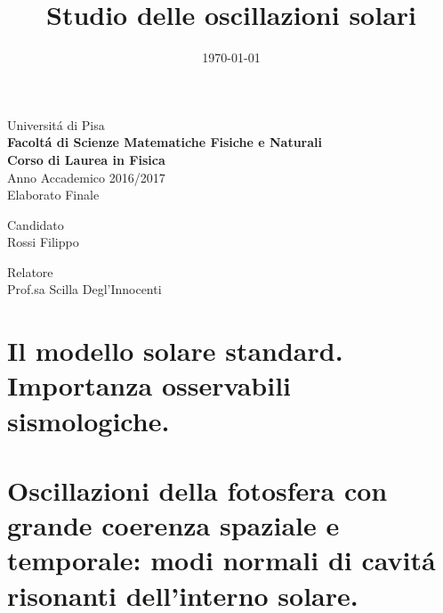 \documentclass[twoside,11pt,fleqn]{memoir}%
\author{ }
\title{Studio delle oscillazioni solari}
\date{\today}
\makeatletter
\newcommand{\titolo}{\@title}
\makeatother
\begin{document}
\begingroup

\thispagestyle{empty}
\begin{center}
\Huge Universit\'a di Pisa\\ \vspace{1cm}\textbf{\huge Facolt\'a di Scienze Matematiche Fisiche e Naturali}\\ \vspace{2cm} \textbf{\LARGE Corso di Laurea in Fisica}\\\Large Anno Accademico 2016/2017\\ \vspace{5cm} \LARGE Elaborato Finale\\ \vspace{1cm} \huge\titolo

\end{center}

\vspace{9cm}

\begin{minipage}[l]{0.5\textwidth}\Large
Candidato\\
Rossi Filippo
\end{minipage}
\begin{minipage}[r]{0.5\textwidth}\Large
Relatore\\Prof.sa Scilla Degl'Innocenti
\end{minipage}
\frontmatter

\endgroup

\cleartorecto


\tableofcontents*

%


\mainmatter


\cleartorecto
\part{Il modello solare standard. Importanza osservabili sismologiche.}



\cleartorecto
\part{Oscillazioni della fotosfera con grande coerenza spaziale e temporale: modi normali di cavit\'a risonanti dell'interno solare.}
\end{document}
